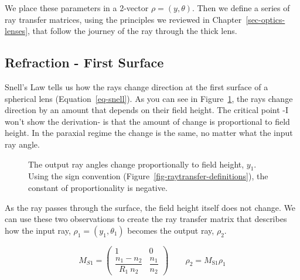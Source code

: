 \documentclass[
  letterpaper,
]{book}
\begin{document}
We place these parameters in a 2-vector \(\rho = (y, \theta)\). Then we
define a series of ray transfer matrices, using the principles we
reviewed in Chapter~\ref{sec-optics-lenses}, that follow the journey of
the ray through the thick lens.

\subsection{Refraction - First
Surface}\label{refraction---first-surface}

Snell's Law tells us how the rays change direction at the first surface
of a spherical lens (Equation~\ref{eq-snell}). As you can see in
Figure~\ref{fig-1st-surface}, the rays change direction by an amount
that depends on their field height. The critical point -I won't show the
derivation- is that the amount of change is proportional to field
height. In the paraxial regime the change is the same, no matter what
the input ray angle.

\begin{figure}


\caption{\label{fig-1st-surface}The output ray angles change
proportionally to field height, \(y_1\). Using the sign convention
(Figure~\ref{fig-raytransfer-definitions}), the constant of
proportionality is negative.}

\end{figure}%

As the ray passes through the surface, the field height itself does not
change. We can use these two observations to create the ray transfer
matrix that describes how the input ray, \(\rho_1 = (y_1, \theta_1)\)
becomes the output ray, \(\rho_2\).

\[
M_{S1} =
\begin{pmatrix}
1 & 0 \\
\dfrac{n_1 - n_2}{R_1 ~ n_2} & \dfrac{n_1}{n_2}
\end{pmatrix}
\qquad
\rho_2 = M_{\text{S1}} \rho_1
\]
\end{document}
